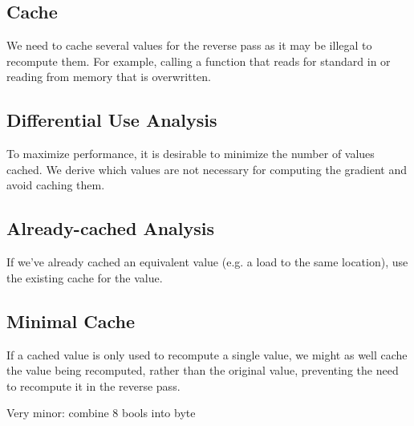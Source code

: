 \subsection{Cache}
We need to cache several values for the reverse pass as it may be illegal to recompute them. For example, calling a function that reads for standard in or reading from memory that is overwritten. 

\subsection{Differential Use Analysis}
To maximize performance, it is desirable to minimize the number of values cached. We derive which values are not necessary for computing the gradient and avoid caching them.

\subsection{Already-cached Analysis}
If we've already cached an equivalent value (e.g. a load to the same location), use the existing cache for the value.

\subsection{Minimal Cache}
If a cached value is only used to recompute a single value, we might as well cache the value being recomputed, rather than the original value, preventing the need to recompute it in the reverse pass.

Very minor: combine 8 bools into byte
